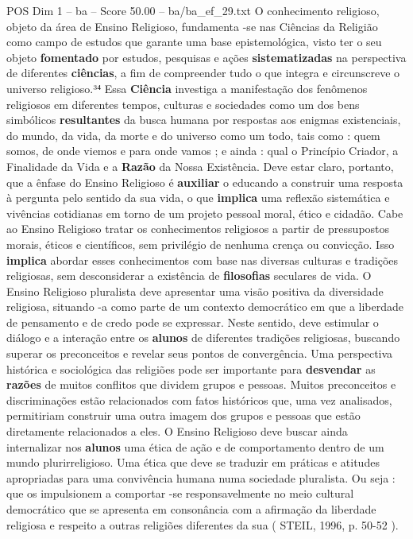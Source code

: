 \begin{textsample}{POS Dim 1 – ba – Score 50.00 – ba/ba\_ef\_29.txt}
O conhecimento religioso, objeto da área de Ensino Religioso, fundamenta -se nas Ciências da Religião como campo de estudos que garante uma base epistemológica, visto ter o seu objeto \textbf{fomentado} por estudos, pesquisas e ações \textbf{sistematizadas} na perspectiva de diferentes \textbf{ciências}, a fim de compreender tudo o que integra e circunscreve o universo religioso.³⁴ Essa \textbf{Ciência} investiga a manifestação dos fenômenos religiosos em diferentes tempos, culturas e sociedades como um dos bens simbólicos \textbf{resultantes} da busca humana por respostas aos enigmas existenciais, do mundo, da vida, da morte e do universo como um todo, tais como : quem somos, de onde viemos e para onde vamos ; e ainda : qual o Princípio Criador, a Finalidade da Vida e a \textbf{Razão} da Nossa Existência.
Deve estar claro, portanto, que a ênfase do Ensino Religioso é \textbf{auxiliar} o educando a construir uma resposta à pergunta pelo sentido da sua vida, o que \textbf{implica} uma reflexão sistemática e vivências cotidianas em torno de um projeto pessoal moral, ético e cidadão.
Cabe ao Ensino Religioso tratar os conhecimentos religiosos a partir de pressupostos morais, éticos e científicos, sem privilégio de nenhuma crença ou convicção.
Isso \textbf{implica} abordar esses conhecimentos com base nas diversas culturas e tradições religiosas, sem desconsiderar a existência de \textbf{filosofias} seculares de vida.
O Ensino Religioso pluralista deve apresentar uma visão positiva da diversidade religiosa, situando -a como parte de um contexto democrático em que a liberdade de pensamento e de credo pode se expressar.
Neste sentido, deve estimular o diálogo e a interação entre os \textbf{alunos} de diferentes tradições religiosas, buscando superar os preconceitos e revelar seus pontos de convergência.
Uma perspectiva histórica e sociológica das religiões pode ser importante para \textbf{desvendar} as \textbf{razões} de muitos conflitos que dividem grupos e pessoas.
Muitos preconceitos e discriminações estão relacionados com fatos históricos que, uma vez analisados, permitiriam construir uma outra imagem dos grupos e pessoas que estão diretamente relacionados a eles.
O Ensino Religioso deve buscar ainda internalizar nos \textbf{alunos} uma ética de ação e de comportamento dentro de um mundo plurirreligioso.
Uma ética que deve se traduzir em práticas e atitudes apropriadas para uma convivência humana numa sociedade pluralista.
Ou seja : que os impulsionem a comportar -se responsavelmente no meio cultural democrático que se apresenta em consonância com a afirmação da liberdade religiosa e respeito a outras religiões diferentes da sua ( STEIL, 1996, p. 50-52 ).

\end{textsample}
